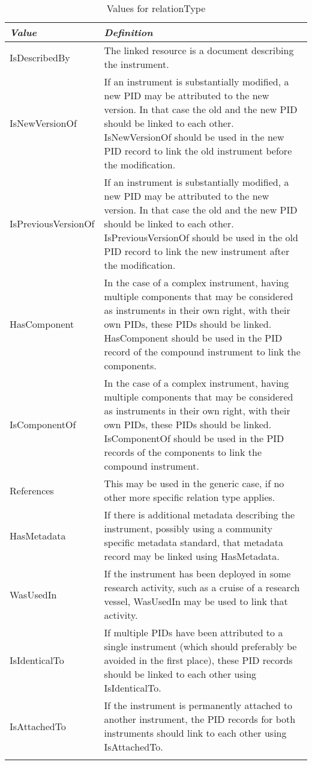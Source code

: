 \documentclass[titlepage=true,twoside=false,DIV=13]{scrartcl}
\begin{document}
\begin{longtable}{|l|p{\valdefcolw}|}
  \hline
  \emph{Value} & \emph{Definition} \\
  \hline \endhead
  \hline \endfoot\endlastfoot
  IsDescribedBy       &
  The linked resource is a document describing the instrument.
  \\ \hline
  IsNewVersionOf      &
  If an instrument is substantially modified, a new PID may be
  attributed to the new version.  In that case the old and the new PID
  should be linked to each other.  IsNewVersionOf should be used in
  the new PID record to link the old instrument before the
  modification.
  \\ \hline
  IsPreviousVersionOf &
  If an instrument is substantially modified, a new PID may be
  attributed to the new version.  In that case the old and the new PID
  should be linked to each other.  IsPreviousVersionOf should be used
  in the old PID record to link the new instrument after the
  modification.
  \\ \hline
  HasComponent        &
  In the case of a complex instrument, having multiple components that
  may be considered as instruments in their own right, with their own
  PIDs, these PIDs should be linked.  HasComponent should be used in
  the PID record of the compound instrument to link the components.
  \\ \hline
  IsComponentOf       &
  In the case of a complex instrument, having multiple components that
  may be considered as instruments in their own right, with their own
  PIDs, these PIDs should be linked.  IsComponentOf should be used in
  the PID records of the components to link the compound instrument.
  \\ \hline
  References          &
  This may be used in the generic case, if no other more specific
  relation type applies.
  \\ \hline
  HasMetadata         &
  If there is additional metadata describing the instrument, possibly
  using a community specific metadata standard, that metadata record
  may be linked using HasMetadata.
  \\ \hline
  WasUsedIn           &
  If the instrument has been deployed in some research activity, such
  as a cruise of a research vessel, WasUsedIn may be used to link that
  activity.
  \\ \hline
  IsIdenticalTo       &
  If multiple PIDs have been attributed to a single instrument (which
  should preferably be avoided in the first place), these PID records
  should be linked to each other using IsIdenticalTo.
  \\ \hline
  IsAttachedTo        &
  If the instrument is permanently attached to another instrument, the
  PID records for both instruments should link to each other using
  IsAttachedTo.
  \\ \hline
  \caption{Values for relationType}
  \label{tab:schema:values:relationType}
\end{longtable}
\end{document}
